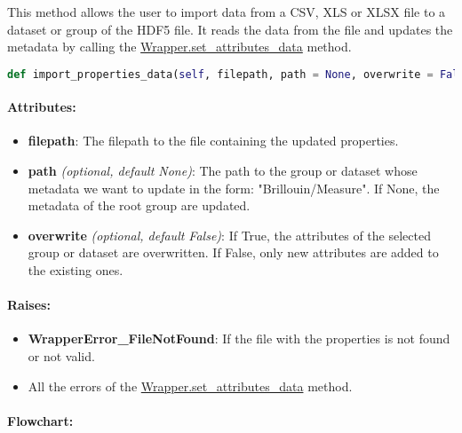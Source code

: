 This method allows the user to import data from a CSV, XLS or XLSX file to a dataset or group of the HDF5 file. It reads the data from the file and updates the metadata by calling the \hyperref[subchapter:wrapper.set_attributes_data]{Wrapper.set\_attributes\_data} method.

\begin{lstlisting}[language=Python]
def import_properties_data(self, filepath, path = None, overwrite = False):
\end{lstlisting}

\paragraph{Attributes:}

\begin{itemize}
    \item \textbf{filepath}: The filepath to the file containing the updated properties.
    \item \textbf{path} \textit{(optional, default None)}: The path to the group or dataset whose metadata we want to update in the form: "Brillouin/Measure". If None, the metadata of the root group are updated.
    \item \textbf{overwrite} \textit{(optional, default False)}: If True, the attributes of the selected group or dataset are overwritten. If False, only new attributes are added to the existing ones.
\end{itemize}

\paragraph{Raises:}
\begin{itemize}
    \item \textbf{WrapperError\_FileNotFound}: If the file with the properties is not found or not valid.
    \item All the errors of the \hyperref[subchapter:wrapper.set_attributes_data]{Wrapper.set\_attributes\_data} method.
\end{itemize}


\paragraph{Flowchart:}

